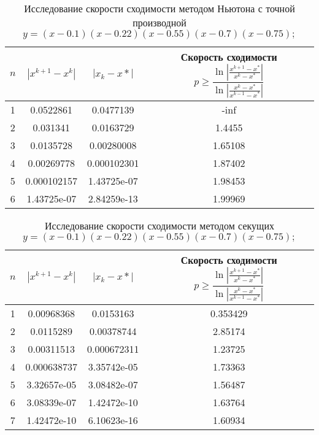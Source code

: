 \documentclass{article}
\begin{document}
    \begin{table}[H]
        \centering
        \caption{Исследование скорости сходимости методом Ньютона с точной производной \mbox{$y = (x - 0.1)(x - 0.22)(x - 0.55)(x - 0.7)(x - 0.75);$}}
        \begin{tabular}{|c|c|c|c|}
            \hline
            $n$ & $|x^{k+1} - x^k|$ & $ |x_k - x*|$ & Скорость сходимости $p \geqslant \dfrac{\ln | \frac{x^{k+1}-x^*}{x^k - x^*} |}{\ln |\frac{x^k -x^*}{x^{k-1} - x^*}|}$ \\
            \hline 
            1 & 0.0522861 & 0.0477139 & -inf \\ \hline
            2 & 0.031341 & 0.0163729 & 1.4455 \\ \hline
            3 & 0.0135728 & 0.00280008 & 1.65108 \\ \hline
            4 & 0.00269778 & 0.000102301 & 1.87402 \\ \hline
            5 & 0.000102157 & 1.43725e-07 & 1.98453 \\ \hline
            6 & 1.43725e-07 & 2.84259e-13 & 1.99969 \\ \hline
        \end{tabular}
    \end{table}
    \begin{table}[H]
        \centering
        \caption{Исследование скорости сходимости методом секущих \mbox{$y = (x - 0.1)(x - 0.22)(x - 0.55)(x - 0.7)(x - 0.75);$}}
        \begin{tabular}{|c|c|c|c|}
            \hline
            $n$ & $|x^{k+1} - x^k|$ & $ |x_k - x*|$ & Скорость сходимости $p \geqslant \dfrac{\ln | \frac{x^{k+1}-x^*}{x^k - x^*} |}{\ln |\frac{x^k -x^*}{x^{k-1} - x^*}|}$ \\
            \hline 
            1 & 0.00968368 & 0.0153163 & 0.353429 \\ \hline
            2 & 0.0115289 & 0.00378744 & 2.85174 \\ \hline
            3 & 0.00311513 & 0.000672311 & 1.23725 \\ \hline
            4 & 0.000638737 & 3.35742e-05 & 1.73363 \\ \hline
            5 & 3.32657e-05 & 3.08482e-07 & 1.56487 \\ \hline
            6 & 3.08339e-07 & 1.42472e-10 & 1.63764 \\ \hline
            7 & 1.42472e-10 & 6.10623e-16 & 1.60934 \\ \hline
        \end{tabular}
    \end{table}
\end{document}
